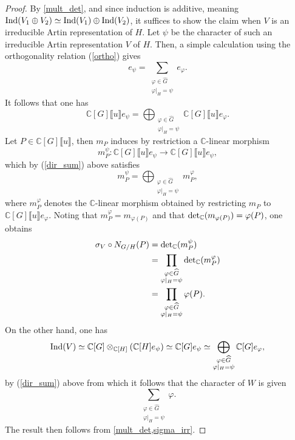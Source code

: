 \documentclass[11pt]{amsart}
\numberwithin{equation}{section}
\theoremstyle{remark}
\theoremstyle{definition}
\begin{document}
\begin{proof}
By \cref{mult_det}, and since induction is additive, meaning ${\rm Ind}(V_{1}\oplus V_{2}) \simeq {\rm Ind}(V_{1}) \oplus {\rm Ind}(V_{2})$, it suffices to show the claim when $V$ is an irreducible Artin representation of $H$.  Let $\psi$ be the character of such an irreducible Artin representation $V$ of $H$.  Then, a simple calculation using the orthogonality relation (\ref{ortho}) gives
\begin{equation} \label{dir_sum}
e_{\psi} = \sum_{\substack{\varphi \in \widehat{G} \\ \varphi \vert_{H} = \psi}} e_{\varphi}.
\end{equation}
It follows that one has
$$\mathbb{C}[G]\llbracket u \rrbracket e_{\psi} =\bigoplus_{\substack{\varphi \in \widehat{G}\\ \varphi|_{H} = \psi}}\mathbb{C}[G]\llbracket u \rrbracket e_{\varphi}. $$
Let $P \in \mathbb{C}[G]\llbracket u \rrbracket$, then $m_{P}$ induces by restriction a $\mathbb{C}$-linear morphism 
$$m_{P}^{\psi}:\mathbb{C}[G]\llbracket u \rrbracket e_{\psi} \rightarrow \mathbb{C}[G]\llbracket u \rrbracket e_{\psi},$$
which by (\ref{dir_sum}) above satisfies 
$$m_{P}^{\psi} = \bigoplus_{\substack{\varphi \in \widehat{G}\\ \varphi|_{H} = \psi}} m_{P}^{\varphi}, $$
where $m_{P}^{\varphi}$ denotes the $\mathbb{C}$-linear morphism obtained by restricting $m_{P}$ to $\mathbb{C}[G]\llbracket u \rrbracket e_{\varphi}$.  Noting that $m_{P}^{\varphi} = m_{\varphi(P)}$ and that ${\rm det}_{\mathbb{C}}(m_{\varphi(P)}) = \varphi(P)$, one obtains 
\begin{equation*}
\begin{aligned} 
\sigma_{V} \circ N_{G/H}(P) &= {\rm det}_{\mathbb{C}}(m_{P}^{\psi}) \\
&= \prod_{\substack{\varphi \in \widehat{G} \\ \varphi|_{H} = \psi}} {\rm det}_{\mathbb{C}}(m_{P}^{\varphi}) \\
&= \prod_{\substack{\varphi \in \widehat{G} \\ \varphi|_{H} = \psi}} \varphi(P).
\end{aligned}
\end{equation*}
On the other hand, one has
$${\rm Ind}(V) \simeq \mathbb{C}[G] \otimes_{\mathbb{C}[H]}(\mathbb{C}[H]e_{\psi}) \simeq \mathbb{C}[G]e_{\psi} \simeq \bigoplus_{\substack{\varphi \in \widehat{G} \\ \varphi|_{H} = \psi}} \mathbb{C}[G]e_{\varphi}, $$
by (\ref{dir_sum}) above from which it follows that the character of $W$ is given 
$$\sum_{\substack{\varphi \in \widehat{G} \\ \varphi|_{H} = \psi}} \varphi. $$
The result then follows from \cref{mult_det,sigma_irr}.
\end{proof}
\end{document}
